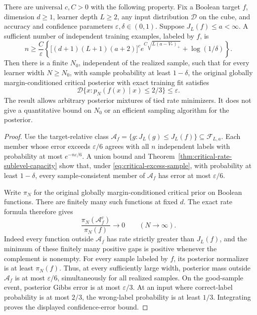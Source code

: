 \begin{theorem}
\label{thm:critical-excess-learning}
There are universal $c,C>0$ with the following property. Fix a Boolean
target $f$, dimension $d\ge1$, learner depth $L\ge2$, any input
distribution $\mathcal D$ on the cube, and accuracy and confidence
parameters $\varepsilon,\delta\in(0,1)$. Suppose $J_L(f)\le a<\infty$.
A sufficient number of independent training examples, labeled by $f$, is
\begin{equation}\label{eq:critical-excess-sample}
 n\ge\frac{C}{\varepsilon}\left\{
   \bigl[(d+1)(L+1)(a+2)\bigr]^c
     e^{C\sqrt{L(a-V_*)_+}}
   +\log(1/\delta)\right\}.
\end{equation}
Then there is a finite $N_0$, independent of the realized sample,
such that for every learner width $N\ge N_0$, with sample probability
at least $1-\delta$, the original globally margin-conditioned critical
posterior with exact training fit satisfies
\[
 \mathcal D\{x:p_N(f(x)\mid x)\le2/3\}\le\varepsilon.
\]
The result allows arbitrary posterior mixtures of tied rate minimizers.
It does not give a quantitative bound on $N_0$ or an efficient sampling
algorithm for the posterior.
\end{theorem}

\begin{proof}
Use the target-relative class
$\mathcal A_f=\{g:J_L(g)\le J_L(f)\}\subseteq\mathcal F_{L,a}$.
Each member whose error exceeds $\varepsilon/6$ agrees with all $n$
independent labels with probability at most $e^{-n\varepsilon/6}$.
A union bound and Theorem~\ref{thm:critical-rate-sublevel-capacity}
show that, under \eqref{eq:critical-excess-sample}, with probability
at least $1-\delta$, every sample-consistent member of $\mathcal A_f$
has error at most $\varepsilon/6$.

Write $\pi_N$ for the original globally margin-conditioned critical
prior on Boolean functions. There are finitely many such functions
at fixed $d$. The exact rate formula therefore gives
\[
 \frac{\pi_N(\mathcal A_f^c)}{\pi_N(f)}\longrightarrow0
 \qquad(N\to\infty).
\]
Indeed every function outside $\mathcal A_f$ has rate strictly greater
than $J_L(f)$, and the minimum of these finitely many positive gaps
is positive whenever the complement is nonempty. For every sample
labeled by $f$, its posterior normalizer is at least $\pi_N(f)$.
Thus, at every sufficiently large width, posterior mass outside
$\mathcal A_f$ is at most $\varepsilon/6$, simultaneously for all
realized samples. On the good-sample event, posterior Gibbs error is
at most $\varepsilon/3$. At an input where correct-label probability
is at most $2/3$, the wrong-label probability is at least $1/3$.
Integrating proves the displayed confidence-error bound.
\end{proof}

